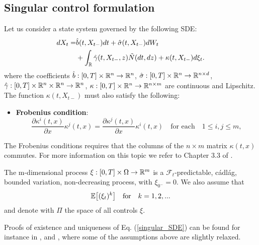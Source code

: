 \subsection{Singular control formulation}\label{singular_sec2}

Let us consider a state system governed by the following SDE:
\begin{align}\label{singular_SDE}
 dX_t =& \hat b(t,X_{t-}) dt + \hat \sigma (t,X_{t-}) dW_t \\ \nonumber
      &+ \int_{\mathbb{R}} \hat \gamma(t,X_{t-},z) \tilde N(dt,dz) + \kappa(t,X_{t-}) d\xi_t .
\end{align} 
where the coefficients 
$\hat b: [0,T]\times \mathbb{R}^n \to \mathbb{R}^n$, $\hat \sigma: [0,T]\times \mathbb{R}^n \to \mathbb{R}^{n \times d}$, 
$\hat \gamma: [0,T]\times \mathbb{R}^n \times \mathbb{R}^n \to \mathbb{R}^{n}$, $\kappa : [0,T] \times \mathbb{R}^n \to \mathbb{R}^{n \times m}$
are continuous and Lipschitz.
The function $\kappa(t,X_{t-})$ must also satisfy the following:
\begin{itemize}
 \item \textbf{Frobenius condition}:
 \begin{equation}\label{Frobenius}
  \frac{\partial \kappa^i(t,x)}{\partial x} \kappa^j(t,x) = \frac{\partial \kappa^j(t,x)}{\partial x} \kappa^i(t,x) \quad \mbox{for each} \quad 1 \leq i, j \leq m,
 \end{equation}
\end{itemize}
The Frobenius conditions requires that the columns of the $n\times m$ matrix $\kappa(t,x)$ commutes. For more information on this topic we refer to Chapter 3.3 of \cite{Arutyunov}.  

The m-dimensional process $\xi : [0,T] \times \Omega \to \mathbb{R}^m$ is a $\mathcal{F}_t$-predictable, cádlág, bounded variation, 
non-decreasing process, with $\xi_{0^-} = 0$. 
We also assume that 
\begin{equation}\label{singular_moments}
\mathbb{E}\bigl[ (\xi_t)^k \bigr] \quad \mbox{for} \quad k=1,2,...  
\end{equation}
and denote with $\Pi$ the space of all controls $\xi$.

Proofs of existence and uniqueness of Eq. (\ref{singular_SDE}) can be found for instance in \cite{DoDa76}, \cite{Gal78} and \cite{GyKr80}, 
where some of the assumptions above are slightly relaxed.     


